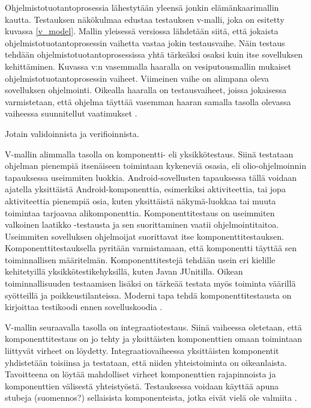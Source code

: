 Ohjelmistotuotantoprosessia lähestytään yleensä jonkin elämänkaarimallin kautta. Testauksen näkökulmaa edustaa testauksen v-malli, joka on esitetty kuvassa \ref{v_model}. Mallin yleisessä versiossa lähdetään siitä, että jokaista ohjelmistotuotantoprosessin vaihetta vastaa jokin testausvaihe. Näin testaus tehdään ohjelmistotuotantoprosessissa yhtä tärkeäksi osaksi kuin itse sovelluksen kehittäminen. Kuvassa v:n vasemmalla haaralla on vesiputousmallin mukaiset ohjelmistotuotantoprosessin vaiheet. Viimeinen vaihe on alimpana oleva sovelluksen ohjelmointi. Oikealla haaralla on testausvaiheet, joissa jokaisessa varmistetaan, että ohjelma täyttää vasemman haaran samalla tasolla olevassa vaiheessa suunnitellut vaatimukset \cite[39-42]{testing_foundations}.

Jotain validoinnista ja verifioinnista.

V-mallin alimmalla tasolla on komponentti- eli yksikkötestaus. Siinä testataan ohjelman pienempiä itsenäiseen toimintaan kykeneviä osasia, eli olio-ohjelmoinnin tapauksessa useimmiten luokkia. Android-sovellusten tapauksessa tällä voidaan ajatella yksittäistä Android-komponenttia, esimerkiksi aktiviteettia, tai jopa aktiviteettia pienempiä osia, kuten yksittäistä näkymä-luokkaa tai muuta toimintaa tarjoavaa alikomponenttia. Komponenttitestaus on useimmiten valkoinen laatikko -testausta ja sen suorittaminen vaatii ohjelmointitaitoa. Useimmiten sovelluksen ohjelmoijat suorittavat itse komponenttitestauksen. Komponenttitestauksella pyritään varmistamaan, että komponentti täyttää sen toiminnallisen määritelmän. Komponenttitestejä tehdään usein eri kielille kehitetyillä yksikkötestikehyksillä, kuten Javan JUnitilla. Oikean toiminnallisuuden testaamisen lisäksi on tärkeää testata myös toiminta väärillä syötteillä ja poikkeustilanteissa. Moderni tapa tehdä komponenttitestausta on kirjoittaa testikoodi ennen sovelluskoodia \cite[43-50]{testing_foundations}.

V-mallin seuraavalla tasolla on integraatiotestaus. Siinä vaiheessa oletetaan, että komponenttitestaus on jo tehty ja yksittäisten komponenttien omaan toimintaan liittyvät virheet on löydetty. Integraatiovaiheessa yksittäisten komponentit yhdistetään toisiinsa ja testataan, että niiden yhteistoiminta on oikeanlaista. Tavoitteena on löytää mahdolliset virheet komponenttien rajapinnoista ja komponenttien välisestä yhteistyöstä. Testauksessa voidaan käyttää apuna stubeja (suomennos?) sellaisista komponenteista, jotka eivät vielä ole valmiita \cite[50-52]{testing_foundations}.


